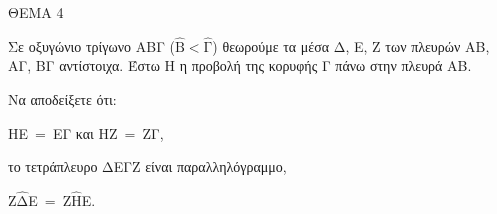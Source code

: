 
ΘΕΜΑ 4

Σε οξυγώνιο τρίγωνο ΑΒΓ ($\widehat{\text{Β}} < \widehat{\text{Γ}}$) θεωρούμε τα μέσα Δ, Ε, Ζ των πλευρών ΑΒ, ΑΓ, ΒΓ αντίστοιχα. Έστω Η η προβολή της κορυφής Γ πάνω στην πλευρά ΑΒ.

Να αποδείξετε ότι:

\begin{alist}
\item ΗΕ$\  = \ $ΕΓ και ΗΖ$\  = \ $ΖΓ, 

\item το τετράπλευρο ΔΕΓΖ είναι παραλληλόγραμμο, 

\item Ζ$\widehat{\text{Δ}}$Ε$\  = \ $Ζ$\widehat{\text{Η}}$Ε. 
\end{alist}
